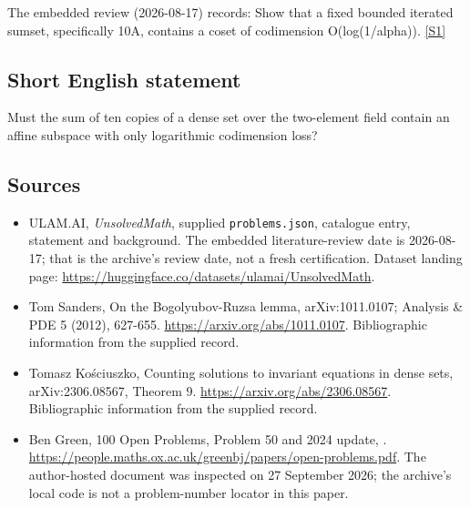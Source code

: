 \documentclass[11pt,a4paper]{article}
\newcommand{\sref}[2]{\hyperlink{source:#1:#2}{[S#2]}}
\begin{document}
The embedded review (2026-08-17) records: Show that a fixed bounded iterated sumset, specifically 10A, contains a coset of codimension O(log(1/alpha)). \sref{statement}{1}

\subsection{Short English statement}

Must the sum of ten copies of a dense set over the two-element field contain an affine subspace with only logarithmic codimension loss?

\subsection{Sources}

{\small

\begin{itemize}

\item[\hypertarget{source:statement:1}{S1}] ULAM.AI, \emph{UnsolvedMath}, supplied \texttt{problems.json}, catalogue entry, statement and background. The embedded literature-review date is 2026-08-17; that is the archive’s review date, not a fresh certification. Dataset landing page: \url{https://huggingface.co/datasets/ulamai/UnsolvedMath}.

\item[\hypertarget{source:statement:2}{S2}] Tom Sanders, On the Bogolyubov-Ruzsa lemma, arXiv:1011.0107; Analysis \& PDE 5 (2012), 627-655. \url{https://arxiv.org/abs/1011.0107}. Bibliographic information from the supplied record.

\item[\hypertarget{source:statement:3}{S3}] Tomasz Kościuszko, Counting solutions to invariant equations in dense sets, arXiv:2306.08567, Theorem 9. \url{https://arxiv.org/abs/2306.08567}. Bibliographic information from the supplied record.

\item[\hypertarget{source:statement:4}{S4}] Ben Green, 100 Open Problems, Problem 50 and 2024 update, . \url{https://people.maths.ox.ac.uk/greenbj/papers/open-problems.pdf}. The author-hosted document was inspected on 27 September 2026; the archive’s local code is not a problem-number locator in this paper.

\end{itemize}

}

\label{end:statement}
\end{document}
